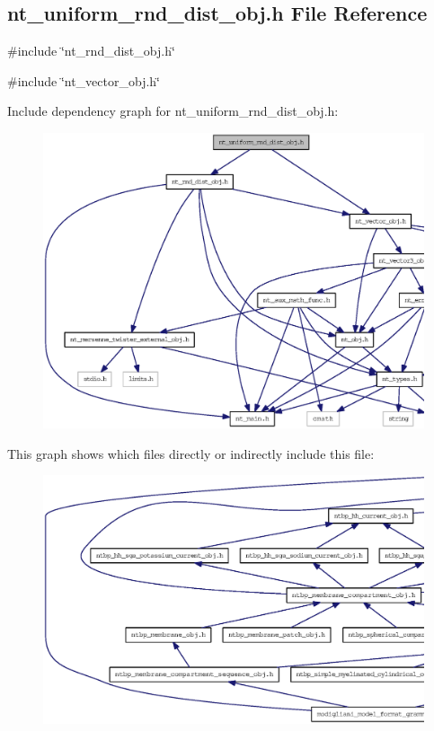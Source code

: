 \subsection{nt\_\-uniform\_\-rnd\_\-dist\_\-obj.h File Reference}
\label{nt__uniform__rnd__dist__obj_8h}
{\ttfamily \#include \char`\"{}nt\_\-rnd\_\-dist\_\-obj.h\char`\"{}}\par
{\ttfamily \#include \char`\"{}nt\_\-vector\_\-obj.h\char`\"{}}\par
Include dependency graph for nt\_\-uniform\_\-rnd\_\-dist\_\-obj.h:
\nopagebreak
\begin{figure}[H]
\begin{center}
\leavevmode
\includegraphics[width=400pt]{nt__uniform__rnd__dist__obj_8h__incl}
\end{center}
\end{figure}
This graph shows which files directly or indirectly include this file:
\nopagebreak
\begin{figure}[H]
\begin{center}
\leavevmode
\includegraphics[width=400pt]{nt__uniform__rnd__dist__obj_8h__dep__incl}
\end{center}
\end{figure}
